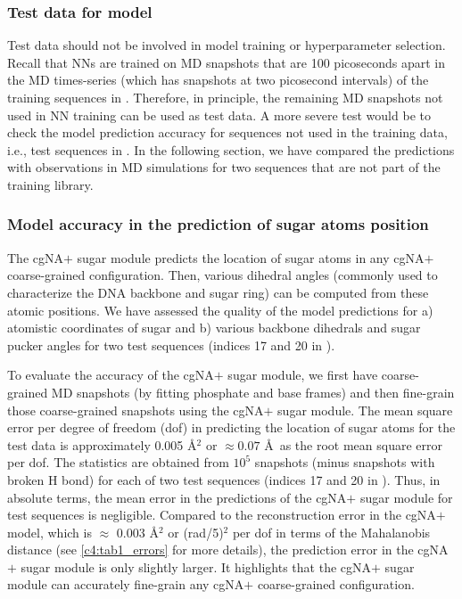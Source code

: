 \subsubsection{Test data for model}
Test data should not be involved in model training or hyperparameter selection.
Recall that NNs are trained on MD snapshots that are 100 picoseconds apart in the MD times-series (which has snapshots at two picosecond intervals) of the training sequences in \Lbdna.
Therefore, in principle, the remaining MD snapshots not used in NN training can be used as test data.
A more severe test would be to check the model prediction accuracy for sequences not used in the training data, i.e., test sequences in \Lbdna.
In the following section, we have compared the predictions with observations in MD simulations for two sequences that are not part of the training library. 

\subsubsection{Model accuracy in the prediction of sugar atoms position}
The cgNA$+$ sugar module predicts the location of sugar atoms in any cgNA$+$ coarse-grained configuration.
Then, various dihedral angles (commonly used to characterize the DNA backbone and sugar ring) can be computed from these atomic positions.
We have assessed the quality of the model predictions for a) atomistic coordinates of sugar and b) various backbone dihedrals and sugar pucker angles for two test sequences (indices 17 and 20 in \Lbdna).

To evaluate the accuracy of the cgNA$+$ sugar module, we first have coarse-grained MD snapshots (by fitting phosphate and base frames) and then fine-grain those coarse-grained snapshots using the cgNA$+$ sugar module.
The mean square error per degree of freedom (dof) in predicting the location of sugar atoms for the test data is approximately 0.005 \AA$^2$ or $\approx 0.07$ \AA \ as the root mean square error per dof.
The statistics are obtained from $10^5$ snapshots (minus snapshots with broken H bond) for each of two test sequences (indices 17 and 20 in \Lbdna).
Thus, in absolute terms, the mean error in the predictions of the cgNA$+$ sugar module for test sequences is negligible.
Compared to the reconstruction error in the cgNA$+$ model, which is $\approx$ 0.003 \AA$^2$ or (rad/5)$^2$ per dof in terms of the Mahalanobis distance (see \cref{c4:tab1_errors} for more details), the prediction error in the cgNA$+$ sugar module is only slightly larger.
It highlights that the cgNA$+$ sugar module can accurately fine-grain any cgNA$+$ coarse-grained configuration.

